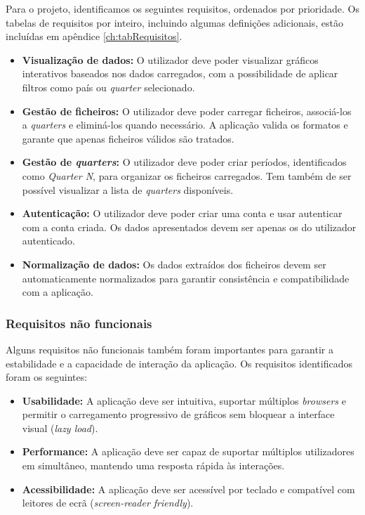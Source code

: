 Para o projeto, identificamos os seguintes requisitos, ordenados por prioridade. Os tabelas de requisitos por inteiro, incluindo algumas definições adicionais, estão incluídas em apêndice \ref{ch:tabRequisitos}.

\begin{itemize}
    \item \textbf{Visualização de dados:} O utilizador deve poder visualizar gráficos interativos baseados nos dados carregados, com a possibilidade de aplicar filtros como país ou \textit{quarter} selecionado.

    \item \textbf{Gestão de ficheiros:} O utilizador deve poder carregar ficheiros, associá-los a \textit{quarters} e eliminá-los quando necessário. A aplicação valida os formatos e garante que apenas ficheiros válidos são tratados.
    
    \item \textbf{Gestão de \textit{quarters}:} O utilizador deve poder criar períodos, identificados como \textit{Quarter N}, para organizar os ficheiros carregados. Tem também de ser possível visualizar a lista de \textit{quarters} disponíveis.

    \item \textbf{Autenticação:} O utilizador deve poder criar uma conta e usar autenticar com a conta criada. Os dados apresentados devem ser apenas os do utilizador autenticado.

    \item \textbf{Normalização de dados:} Os dados extraídos dos ficheiros devem ser automaticamente normalizados para garantir consistência e compatibilidade com a aplicação.
    
\end{itemize}

\subsubsection{Requisitos não funcionais}

Alguns requisitos não funcionais também foram importantes para garantir a estabilidade e a capacidade de interação da aplicação. Os requisitos identificados foram os seguintes:

\begin{itemize}
    \item \textbf{Usabilidade:} A aplicação deve ser intuitiva, suportar múltiplos \textit{browsers} e permitir o carregamento progressivo de gráficos sem bloquear a interface visual (\textit{lazy load}).
    
    \item \textbf{Performance:} A aplicação deve ser capaz de suportar múltiplos utilizadores em simultâneo, mantendo uma resposta rápida às interações.
    
    \item \textbf{Acessibilidade:} A aplicação deve ser acessível por teclado e compatível com leitores de ecrã (\textit{screen-reader friendly}).

\end{itemize}

